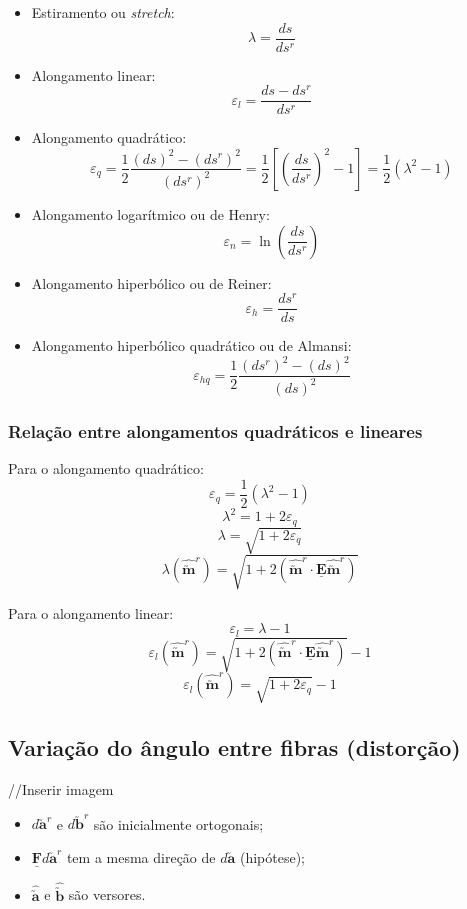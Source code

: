 	\begin{itemize}
		\item Estiramento ou \textit{stretch}:
			\[\lambda=\frac{ds}{ds^r}\]
		\item Alongamento linear:
			\[\varepsilon_l=\frac{ds-ds^r}{ds^r}\]
		\item Alongamento quadrático:
			\[\varepsilon_q=\frac{1}{2}\frac{(ds)^2-(ds^r)^2}{(ds^r)^2}=\frac{1}{2}\left[\left(\frac{ds}{ds^r}\right)^2-1\right]=\frac{1}{2}(\lambda^2-1)\]
		\item Alongamento logarítmico ou de Henry:
			\[\varepsilon_n=\ln \left(\frac{ds}{ds^r}\right)\]
		\item Alongamento hiperbólico ou de Reiner:
			\[\varepsilon_h=\frac{ds^r}{ds}\]
		\item Alongamento hiperbólico quadrático ou de Almansi:
			\[\varepsilon_{hq}=\frac{1}{2}\frac{(ds^r)^2-(ds)^2}{(ds)^2}\]
	\end{itemize}
	
	\subsubsection{Relação entre alongamentos quadráticos e lineares}
	
	Para o alongamento quadrático:
	\[\varepsilon_q=\frac{1}{2}(\lambda^2-1)\]
	\[\lambda^2=1+2\varepsilon_q\]
	\[\lambda=\sqrt{1+2\varepsilon_q}\]
	\[\lambda(\hat{\utilde{\mathbf{m}}}^r)=\sqrt{1+2(\hat{\utilde{\mathbf{m}}}^r\cdot\underline{\mathbf{E}}\hat{\utilde{\mathbf{m}}}^r)}\]
	
	Para o alongamento linear:
	\[\varepsilon_l=\lambda-1\]
	\[\varepsilon_l(\hat{\utilde{\mathbf{m}}}^r)=\sqrt{1+2(\hat{\utilde{\mathbf{m}}}^r\cdot\underline{\mathbf{E}}\hat{\utilde{\mathbf{m}}}^r)}-1\]
	\[\varepsilon_l(\hat{\utilde{\mathbf{m}}}^r)=\sqrt{1+2\varepsilon_q}-1\]
	
	\subsection{Variação do ângulo entre fibras (distorção)}
	
	//Inserir imagem
	
	\begin{itemize}
		\item $d\utilde{\mathbf{a}}^r$ e $d\utilde{\mathbf{b}}^r$ são inicialmente ortogonais;
		\item $\underline{\mathbf{F}}d\utilde{\mathbf{a}}^r$ tem a mesma direção de $d\utilde{\mathbf{a}}$ (hipótese);
		\item $\hat{\utilde{\mathbf{a}}}$ e $\hat{\utilde{\mathbf{b}}}$ são versores.
	\end{itemize}
	
